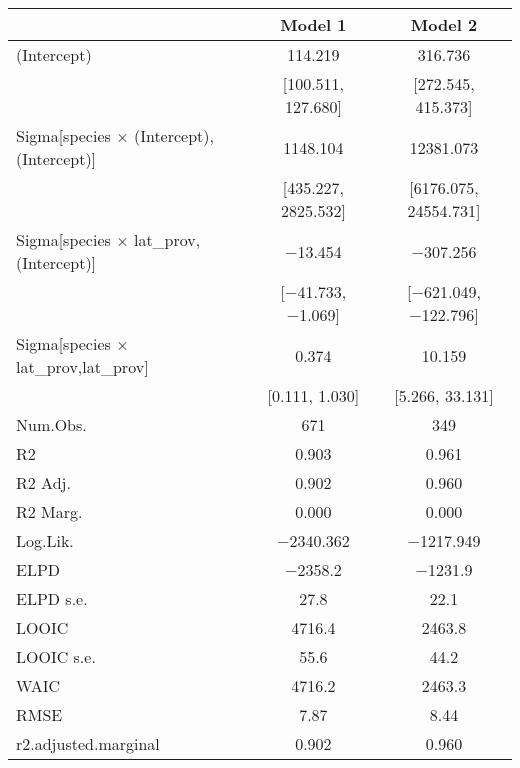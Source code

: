 \begin{table}
\centering
\begin{tabular}[t]{lcc}
\toprule
  & Model 1 & Model 2\\
\midrule
(Intercept) & \num{114.219} & \num{316.736}\\
 & {}[\num{100.511}, \num{127.680}] & {}[\num{272.545}, \num{415.373}]\\
Sigma[species × (Intercept),(Intercept)] & \num{1148.104} & \num{12381.073}\\
 & {}[\num{435.227}, \num{2825.532}] & {}[\num{6176.075}, \num{24554.731}]\\
Sigma[species × lat\_prov,(Intercept)] & \num{-13.454} & \num{-307.256}\\
 & {}[\num{-41.733}, \num{-1.069}] & {}[\num{-621.049}, \num{-122.796}]\\
Sigma[species × lat\_prov,lat\_prov] & \num{0.374} & \num{10.159}\\
 & {}[\num{0.111}, \num{1.030}] & {}[\num{5.266}, \num{33.131}]\\
\midrule
Num.Obs. & \num{671} & \num{349}\\
R2 & \num{0.903} & \num{0.961}\\
R2 Adj. & \num{0.902} & \num{0.960}\\
R2 Marg. & \num{0.000} & \num{0.000}\\
Log.Lik. & \num{-2340.362} & \num{-1217.949}\\
ELPD & \num{-2358.2} & \num{-1231.9}\\
ELPD s.e. & \num{27.8} & \num{22.1}\\
LOOIC & \num{4716.4} & \num{2463.8}\\
LOOIC s.e. & \num{55.6} & \num{44.2}\\
WAIC & \num{4716.2} & \num{2463.3}\\
RMSE & \num{7.87} & \num{8.44}\\
r2.adjusted.marginal & \num{0.902} & \num{0.960}\\
\bottomrule
\end{tabular}
\end{table}

